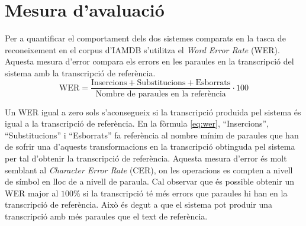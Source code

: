 \section{Mesura d'avaluació}
Per a quantificar el comportament dels dos sistemes comparats en la tasca de reconeixement en el corpus d'IAMDB s'utilitza el \emph{Word Error Rate} (WER). Aquesta mesura d'error compara els errors en les paraules en la transcripció del sistema amb la transcripció de referència.
\begin{equation}\label{eq:wer}
\text{WER} =  \frac{\text{Insercions} + \text{Substitucions} + \text{Esborrats}}{\text{Nombre de paraules en la referència}} \cdot 100
\end{equation}

Un WER igual a zero sols s'aconsegueix si la transcripció produida pel sistema és igual a la transcripció de referència. En la fòrmula \ref{eq:wer}, ``Insercions'', ``Substitucions'' i ``Esborrats'' fa referència al nombre mínim de paraules que han de sofrir una d'aquests transformacions en la transcripció obtinguda pel sistema per tal d'obtenir la transcripció de referència. Aquesta mesura d'error és molt semblant al \emph{Character Error Rate} (CER), on les operacions es compten a nivell de símbol en lloc de a nivell de paraula. Cal observar que és possible obtenir un WER major al $100\%$ si la transcripció té més errors que paraules hi han en la transcripció de referència. Això és degut a que el sistema pot produir una transcripció amb més paraules que el text de referència.

